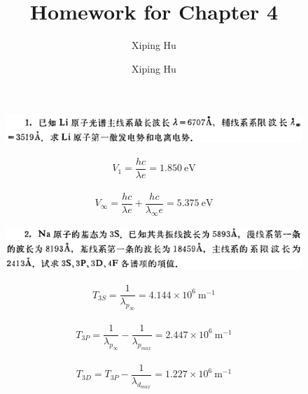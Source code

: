 \documentclass{article}
\author{Xiping Hu}
\author{Xiping Hu}
\affil{https://hxp.plus/}
\title{Homework for Chapter 4}
\begin{document}
\maketitle

\begin{figure}[H]
  \centering
  \includegraphics[width=\linewidth]{figures/1}
  \label{fig:}
\end{figure}

\begin{equation*}
  \begin{aligned}
    V_1 = \dfrac{hc}{\lambda e} = 1.850 \  \mathrm{eV} 
  \end{aligned}
\end{equation*}

\begin{equation*}
  \begin{aligned}
    V_{\infty} = \dfrac{hc}{\lambda e} + \dfrac{hc}{\lambda_{\infty} e} = 5.375 \  \mathrm{eV}  
  \end{aligned}
\end{equation*}

\begin{figure}[H]
  \centering
  \includegraphics[width=\linewidth]{figures/2}
  \label{fig:}
\end{figure}

\begin{equation*}
  \begin{aligned}
    T_{3S} = \dfrac{1}{\lambda_{p_\infty}} = 4.144 \times 10^6 \  \mathrm{m^{-1}} 
  \end{aligned}
\end{equation*}

\begin{equation*}
  \begin{aligned}
    T_{3P} = \dfrac{1}{\lambda_{p_{\infty}}} - \dfrac{1}{\lambda_{p_{max}}} = 2.447 \times 10^6 \  \mathrm{m^{-1}} 
  \end{aligned}
\end{equation*}

\begin{equation*}
  \begin{aligned}
    T_{3D} = T_{3P} - \dfrac{1}{\lambda_{d_{max}}} = 1.227 \times 10^6 \  \mathrm{m^{-1}}
  \end{aligned}
\end{equation*}
\end{document}
